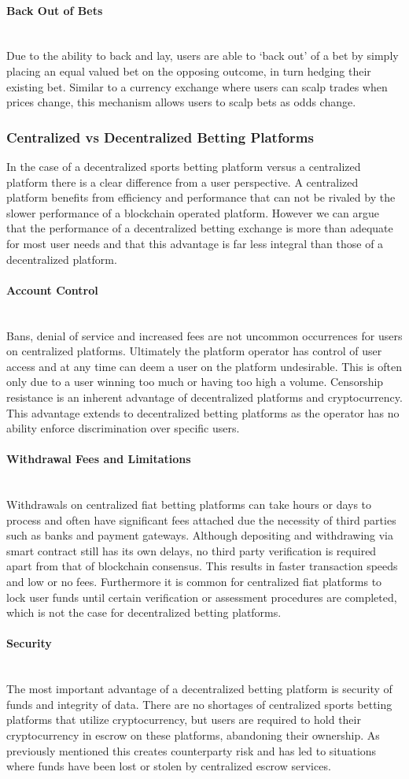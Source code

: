 \documentclass{article}
\newcommand{\myparagraph}[1]{\paragraph{#1}\mbox{}\\ \newline}
\begin{document}
				\myparagraph{Back Out of Bets}		
Due to the ability to back and lay, users are able to ‘back out’ of a bet by simply placing an equal valued bet on the opposing outcome, in turn hedging their existing bet. Similar to a currency exchange where users can scalp trades when prices change, this mechanism allows users to scalp bets as odds change.

			\subsubsection{Centralized vs Decentralized Betting Platforms}

In the case of a decentralized sports betting platform versus a centralized platform there is a clear difference from a user perspective. A centralized platform benefits from efficiency and performance that can not be rivaled by the slower performance of a blockchain operated platform. However we can argue that the performance of a decentralized betting exchange is more than adequate for most user needs and that this advantage is far less integral than those of a decentralized platform.

				\myparagraph{Account Control}					
Bans, denial of service and increased fees are not uncommon occurrences for users on centralized platforms. Ultimately the platform operator has control of user access and at any time can deem a user on the platform undesirable. This is often only due to a user winning too much or having too high a volume. Censorship resistance is an inherent advantage of decentralized platforms and cryptocurrency. This advantage extends to decentralized betting platforms as the operator has no ability enforce discrimination over specific users.

				\myparagraph{Withdrawal Fees and Limitations}			
Withdrawals on centralized fiat betting platforms can take hours or days to process and often have significant fees attached due the necessity of third parties such as banks and payment gateways. Although depositing and withdrawing via smart contract still has its own delays, no third party verification is required apart from that of blockchain consensus. This results in faster transaction speeds and low or no fees. Furthermore it is common for centralized fiat platforms to lock user funds until certain verification or assessment procedures are completed, which is not the case for decentralized betting platforms. 

				\myparagraph{Security}		
The most important advantage of a decentralized betting platform is security of funds and integrity of data. There are no shortages of centralized sports betting platforms that utilize cryptocurrency, but users are required to hold their cryptocurrency in escrow on these platforms, abandoning their ownership. As previously mentioned this creates counterparty risk and has led to situations where funds have been lost or stolen by centralized escrow services.		
	
\end{document}
